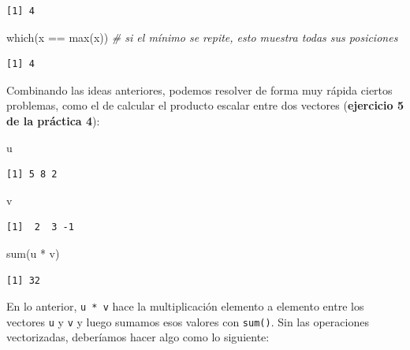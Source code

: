 \documentclass[
]{book}
\newenvironment{Shaded}{\begin{snugshade}}{\end{snugshade}}
\newcommand{\CommentTok}[1]{\textcolor[rgb]{0.56,0.35,0.01}{\textit{#1}}}
\newcommand{\FunctionTok}[1]{\textcolor[rgb]{0.00,0.00,0.00}{#1}}
\newcommand{\NormalTok}[1]{#1}
\newcommand{\SpecialCharTok}[1]{\textcolor[rgb]{0.00,0.00,0.00}{#1}}
\begin{document}
\begin{itemize}
\begin{verbatim}
[1] 4
\end{verbatim}

\begin{Shaded}
\begin{Highlighting}[]
\FunctionTok{which}\NormalTok{(x }\SpecialCharTok{==} \FunctionTok{max}\NormalTok{(x)) }\CommentTok{\# si el mínimo se repite, esto muestra todas sus posiciones}
\end{Highlighting}
\end{Shaded}

\begin{verbatim}
[1] 4
\end{verbatim}
\end{itemize}

Combinando las ideas anteriores, podemos resolver de forma muy rápida ciertos problemas, como el de calcular el producto escalar entre dos vectores (\textbf{ejercicio 5 de la práctica 4}):

\begin{Shaded}
\begin{Highlighting}[]
\NormalTok{u}
\end{Highlighting}
\end{Shaded}

\begin{verbatim}
[1] 5 8 2
\end{verbatim}

\begin{Shaded}
\begin{Highlighting}[]
\NormalTok{v}
\end{Highlighting}
\end{Shaded}

\begin{verbatim}
[1]  2  3 -1
\end{verbatim}

\begin{Shaded}
\begin{Highlighting}[]
\FunctionTok{sum}\NormalTok{(u }\SpecialCharTok{*}\NormalTok{ v)}
\end{Highlighting}
\end{Shaded}

\begin{verbatim}
[1] 32
\end{verbatim}

En lo anterior, \texttt{u\ *\ v} hace la multiplicación elemento a elemento entre los vectores \texttt{u} y \texttt{v} y luego sumamos esos valores con \texttt{sum()}. Sin las operaciones vectorizadas, deberíamos hacer algo como lo siguiente:
\end{document}
